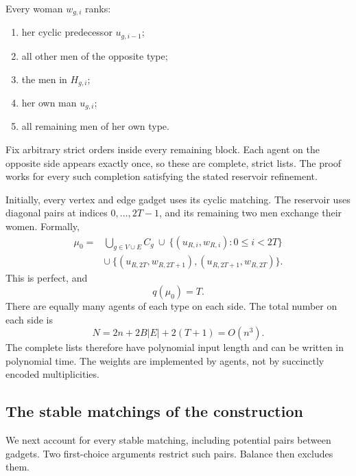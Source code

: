 \documentclass[11pt,letterpaper]{article}
\theoremstyle{definition}
\begin{document}
Every woman $w_{g,i}$ ranks:
\begin{enumerate}[label=(\roman*),leftmargin=2.7em,itemsep=.6ex]
\item her cyclic predecessor $u_{g,i-1}$;
\item all other men of the opposite type;
\item the men in $H_{g,i}$;
\item her own man $u_{g,i}$;
\item all remaining men of her own type.
\end{enumerate}
Fix arbitrary strict orders inside every remaining block. Each agent on the opposite side appears exactly once, so these are complete, strict lists. The proof works for every such completion satisfying the stated reservoir refinement.

Initially, every vertex and edge gadget uses its cyclic matching. The reservoir uses diagonal pairs at indices $0,\ldots,2T-1$, and its remaining two men exchange their women. Formally,
\begin{equation}\tag{7}
\begin{aligned}
\mu_0={}&\bigcup_{g\in V\cup E} C_g\ \cup\ \{(u_{R,i},w_{R,i}):0\le i<2T\}\\
&\cup\ \{(u_{R,2T},w_{R,2T+1}),(u_{R,2T+1},w_{R,2T})\}.
\end{aligned}
\end{equation}
This is perfect, and
\begin{equation}\tag{8}
q(\mu_0)=T.
\end{equation}
There are equally many agents of each type on each side. The total number on each side is
\begin{equation}\tag{9}
N=2n+2B|E|+2(T+1)=O(n^3).
\end{equation}
The complete lists therefore have polynomial input length and can be written in polynomial time. The weights are implemented by agents, not by succinctly encoded multiplicities.

\subsection{The stable matchings of the construction}

We next account for every stable matching, including potential pairs between gadgets. Two first-choice arguments restrict such pairs. Balance then excludes them.
\end{document}
